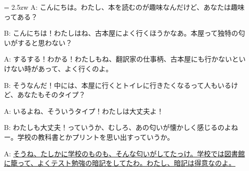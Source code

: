 \documentclass[11pt]{amsart}
\title{}
\author{}
\newenvironment{hangall}[1]{\hangindent = 2.5zw\everypar{\hangindent = 2.5zw}}{}
\begin{document}
\maketitle
\begin{hangall}{}%
A: こんにちは。わたし、本を読むのが趣味なんだけど、あなたは趣味ってある？

B: こんにちは！わたしはね、古本屋によく行くほうかなあ。本屋って独特の匂いがすると思わない？

A: するする！わかる！わたしもね、翻訳家の仕事柄、古本屋にも行かないといけない時があって、よく行くのよ。

B: そうなんだ！中には、本屋に行くとトイレに行きたくなるって人もいるけど、あなたもそのタイプ？

A: いるよね、そういうタイプ！わたしは大丈夫よ！

B: わたしも大丈夫！っていうか、むしろ、あの匂いが懐かしく感じるのよねー。学校の教科書とかプリントを思い出すっていうか。

A: \ul{そうね、たしかに学校のものも、そんな匂いがしてたっけ。学校では図書館に籠って、よくテスト勉強の暗記をしてたわ。わたし、暗記は得意なのよ。}\end{hangall}
\end{document}
